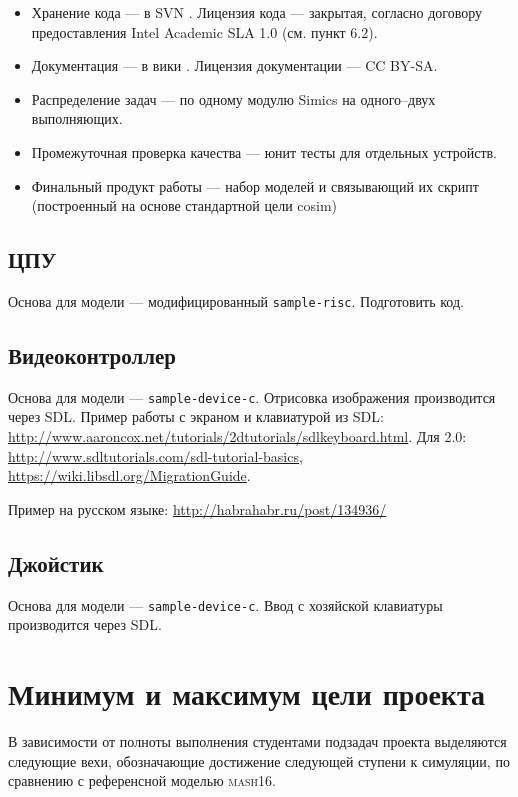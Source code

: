 \begin{itemize}
\item Хранение кода --- в SVN . Лицензия кода --- закрытая, согласно договору предоставления Intel Academic SLA 1.0 (см. пункт 6.2). 

\item Документация --- в вики . Лицензия документации --- CC BY-SA.

\item Распределение задач --- по одному модулю Simics на одного--двух выполняющих.
\item Промежуточная проверка качества --- юнит тесты для отдельных устройств.
\item Финальный продукт работы --- набор моделей и связывающий их скрипт (построенный на основе стандартной цели cosim)
\end{itemize}

\subsection{ЦПУ}

Основа для модели --- модифицированный \texttt{sample-risc}. \todo Подготовить код.

\subsection{Видеоконтроллер}

Основа для модели --- \texttt{sample-device-c}. Отрисовка изображения производится через SDL. Пример работы с экраном и клавиатурой из SDL: \url{http://www.aaroncox.net/tutorials/2dtutorials/sdlkeyboard.html}. Для 2.0: \url{http://www.sdltutorials.com/sdl-tutorial-basics}, \url{https://wiki.libsdl.org/MigrationGuide}.

Пример на русском языке: \url{http://habrahabr.ru/post/134936/}

\subsection{Джойстик}

Основа для модели --- \texttt{sample-device-c}. Ввод с хозяйской клавиатуры производится через SDL.

\section{Минимум и максимум цели проекта}

В зависимости от полноты выполнения студентами подзадач проекта выделяются следующие вехи, обозначающие достижение следующей ступени к симуляции, по сравнению с референсной моделью \textsc{mash16}.

